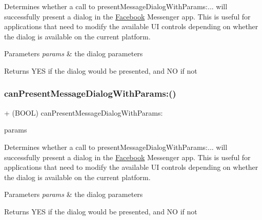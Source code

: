 Determines whether a call to {\ttfamily present\+Message\+Dialog\+With\+Params\+:...} will successfully present a dialog in the \hyperlink{interfaceFacebook}{Facebook} Messenger app. This is useful for applications that need to modify the available UI controls depending on whether the dialog is available on the current platform.


\begin{DoxyParams}{Parameters}
{\em params} & the dialog parameters\\
\hline
\end{DoxyParams}
\begin{DoxyReturn}{Returns}
Y\+ES if the dialog would be presented, and NO if not 
\end{DoxyReturn}
\mbox{\label{interfaceFBDialogs_a81544299ca98179464ec34fc0e8d12b7}} 
\subsubsection{\texorpdfstring{can\+Present\+Message\+Dialog\+With\+Params\+:()}{canPresentMessageDialogWithParams:()}\hspace{0.1cm}{\footnotesize\ttfamily [3/5]}}
{\footnotesize\ttfamily + (B\+O\+OL) can\+Present\+Message\+Dialog\+With\+Params\+: \begin{DoxyParamCaption}\item[{(\hyperlink{interfaceFBLinkShareParams}{F\+B\+Link\+Share\+Params} $\ast$)}]{params }\end{DoxyParamCaption}}

Determines whether a call to {\ttfamily present\+Message\+Dialog\+With\+Params\+:...} will successfully present a dialog in the \hyperlink{interfaceFacebook}{Facebook} Messenger app. This is useful for applications that need to modify the available UI controls depending on whether the dialog is available on the current platform.


\begin{DoxyParams}{Parameters}
{\em params} & the dialog parameters\\
\hline
\end{DoxyParams}
\begin{DoxyReturn}{Returns}
Y\+ES if the dialog would be presented, and NO if not 
\end{DoxyReturn}
\mbox{\label{interfaceFBDialogs_a81544299ca98179464ec34fc0e8d12b7}} 

